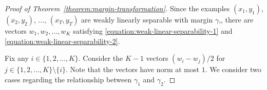 
\begin{proof}[Proof of Theorem~\ref{theorem:margin-transformation}]
Since the examples $(x_1, y_1)$, $(x_2, y_2)$, $\dots$, $(x_T, y_T)$ are weakly
linearly separable with margin $\gamma$,, there are vectors $w_1, w_2, \dots, w_K$
satisfying \eqref{equation:weak-linear-separability-1} and
\eqref{equation:weak-linear-separability-2}.

Fix any $i \in \{1,2,\dots,K\}$. Consider the $K-1$ vectors $(w_i - w_j)/2$ for
$j \in \{1,2,\dots,K\} \setminus \{i\}$. Note that the vectors have norm at most
$1$. We consider two cases regarding the relationship between $\gamma_1$ and
$\gamma_2$.


\end{proof}
